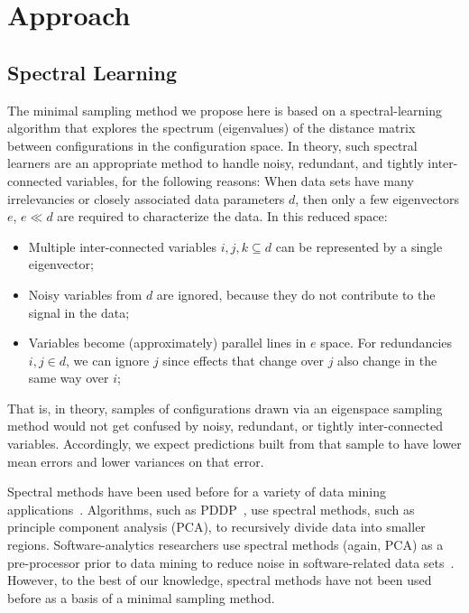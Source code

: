  \section{Approach}

\subsection{Spectral Learning}\label{sect:spect}

The minimal sampling method we propose here is based on a spectral-learning algorithm
that  explores the spectrum (eigenvalues) of the distance matrix between  configurations in the configuration space.
In theory, such spectral learners are an appropriate method to handle noisy, redundant, and tightly inter-connected variables, for the following reasons:
When data sets have many irrelevancies or closely associated data parameters $d$, then
only a few eigenvectors $e$, $e \ll d$  are required to characterize the data.
In this reduced space:
\begin{itemize}
\item
Multiple inter-connected variables $i,j,k \subseteq d$ can be represented
by a single eigenvector;
\item
Noisy variables from $d$ are
ignored, because they  do not contribute to the signal in the data;
\item
Variables  become (approximately) parallel lines
in $e$ space. For  redundancies \mbox{$i,j \in d$}, we
can ignore $j$
since effects that change over $j$ also
change in the same way over $i$;
\end{itemize}
That is, in theory, samples of configurations drawn via an eigenspace sampling method
would not get confused by noisy, redundant, or tightly inter-connected variables. Accordingly,
we expect predictions built from that sample to have  lower mean errors and lower variances on that error.

Spectral methods have been used before for a variety of data mining applications~\cite{kamvar2003spectral}.
Algorithms, such as PDDP~\cite{boley98}, use spectral methods, such as principle component analysis (PCA), to
recursively divide data into smaller regions.  Software-analytics researchers use spectral methods (again, PCA) as a pre-processor prior to data mining  to reduce noise in software-related data sets~\cite{theisen2015approximating}.
However, to the best of our knowledge, spectral methods have not been used before as a basis of a minimal sampling method.


